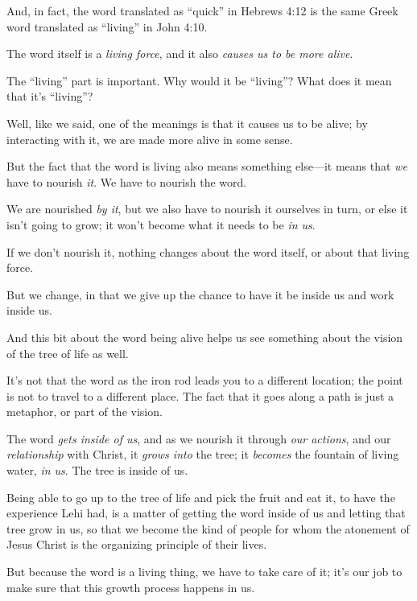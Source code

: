 \begin{compactitem}
\begin{compactitem}
\begin{compactitem}
							\item And, in fact, the word translated as ``quick'' in Hebrews 4:12 is the same Greek word translated as ``living'' in John 4:10.
							\item The word itself is a \textit{living force}, and it also \textit{causes us to be more alive}.
							\item The ``living'' part is important. Why would it be ``living''? What does it mean that it's ``living''?
							\item Well, like we said, one of the meanings is that it causes us to be alive; by interacting with it, we are made more alive in some sense.
							\item But the fact that the word is living also means something else---it means that \textit{we} have to nourish \textit{it}. We have to nourish the word.
							\item We are nourished \textit{by it}, but we also have to nourish it ourselves in turn, or else it isn't going to grow; it won't become what it needs to be \textit{in us}.
							\item If we don't nourish it, nothing changes about the word itself, or about that living force.
							\item But we change, in that we give up the chance to have it be inside us and work inside us.
							\item And this bit about the word being alive helps us see something about the vision of the tree of life as well.
							\item It's not that the word as the iron rod leads you to a different location; the point is not to travel to a different place. The fact that it goes along a path is just a metaphor, or part of the vision.
							\item The word \textit{gets inside of us}, and as we nourish it through \textit{our actions}, and our \textit{relationship} with Christ, it \textit{grows into} the tree; it \textit{becomes} the fountain of living water, \textit{in us}. The tree is inside of us.
							\item Being able to go up to the tree of life and pick the fruit and eat it, to have the experience Lehi had, is a matter of getting the word inside of us and letting that tree grow in us, so that we become the kind of people for whom the atonement of Jesus Christ is the organizing principle of their lives.
							\item But because the word is a living thing, we have to take care of it; it's our job to make sure that this growth process happens in us. 

\end{compactitem}
\end{compactitem}
\end{compactitem}
